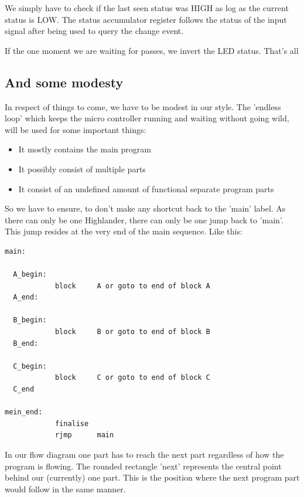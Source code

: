 We simply have to check if the last seen status was HIGH as log as the current status is LOW. The status accumulator register follows the status of the input signal after being used to query the change event.

If the one moment we are waiting for passes, we invert the LED status. That's all


\subsection{And some modesty}

In respect of things to come, we have to be modest in our style. The 'endless loop' which keeps the micro controller running and waiting without going wild, will be used for some important things:

\begin{itemize}
  \item It mostly contains the main program
  \item It possibly consist of multiple parts
  \item It consist of an undefined amount of functional separate program parts
\end{itemize}

So we have to ensure, to don't make any shortcut back to the 'main' label. As there can only be one Highlander, there can only be one jump back to 'main'. This jump resides at the very end of the main sequence. Like this:

\begin{lstlisting}
main:

  A_begin:
            block     A or goto to end of block A
  A_end:

  B_begin:
            block     B or goto to end of block B
  B_end:

  C_begin:
            block     C or goto to end of block C
  C_end

mein_end:
            finalise
            rjmp      main
\end{lstlisting}

In our flow diagram one part has to reach the next part regardless of how the program is flowing. The rounded rectangle 'next' represents the central point behind our (currently) one part. This is the position where the next program part would follow in the same manner.

